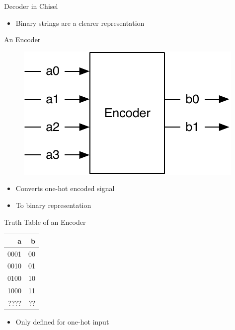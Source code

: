 \begin{frame}[fragile]{Decoder in Chisel}
\begin{itemize}
\item Binary strings are a clearer representation
\end{itemize}
\end{frame}

\begin{frame}[fragile]{An Encoder}
\begin{figure}
  \includegraphics[scale=\scale]{../figures/encoder}
\end{figure}
\begin{itemize}
\item Converts one-hot encoded signal
\item To binary representation
\end{itemize}
\end{frame}

\begin{frame}[fragile]{Truth Table of an Encoder}
\begin{table}
  \begin{tabular}{rr}
    \toprule
    a & b \\
    \midrule
    0001 & 00 \\
    0010 & 01 \\
    0100 & 10 \\
    1000 & 11 \\
    ???? & ?? \\
    \bottomrule 
  \end{tabular} 
\end{table}
\begin{itemize}
\item Only defined for one-hot input
\end{itemize}
\end{frame}

